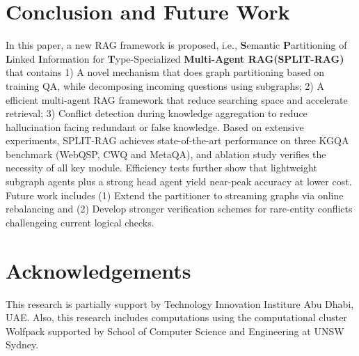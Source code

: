 \documentclass[sigconf]{acmart}
\begin{document}

\section{Conclusion and Future Work}

In this paper, a new RAG framework is proposed, i.e., \textbf{S}emantic \textbf{P}artitioning of \textbf{L}inked \textbf{I}nformation for \textbf{T}ype-Specialized \textbf{Multi-Agent RAG(SPLIT-RAG)} that contains 1) A novel mechanism that does graph partitioning based on training QA, while decomposing incoming questions using subgraphs; 2) A efficient multi-agent RAG framework that reduce searching space and accelerate retrieval; 3) Conflict detection during knowledge aggregation to reduce hallucination facing redundant or false knowledge. Based on extensive experiments, SPLIT-RAG achieves state-of-the-art performance on three KGQA benchmark (WebQSP, CWQ and MetaQA), and ablation study verifies the necessity of all key module. Efficiency tests further show that lightweight subgraph agents plus a strong head agent yield near-peak accuracy at lower cost. Future work includes (1) Extend the partitioner to streaming graphs via online rebalancing and (2) Develop stronger verification schemes for rare-entity conflicts challengeing current logical checks.

\section{Acknowledgements}

This research is partially support by Technology Innovation Institure Abu Dhabi, UAE. Also, this research includes computations using the computational cluster Wolfpack supported by School of Computer Science and Engineering at UNSW Sydney.




\balance

\end{document}
